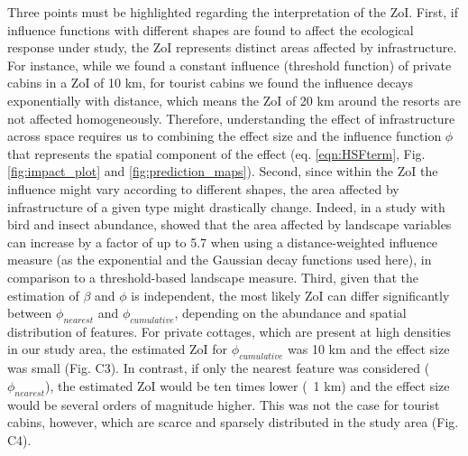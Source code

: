 \documentclass[titlepage]{article}
\begin{document}
Three points must be highlighted regarding the interpretation of the ZoI.
First, if influence functions with different shapes are found to affect the ecological response under study, the ZoI represents distinct areas affected by infrastructure. For instance, while we found a constant influence (threshold function) of private cabins in a ZoI of 10 km, for tourist cabins we found the influence  decays exponentially with distance, which means the ZoI of 20 km around the resorts are not affected homogeneously. Therefore, understanding the effect of infrastructure across space requires us to combining the effect size and the influence function $\phi$ that represents the spatial component of the effect (eq. \ref{eqn:HSFterm}, Fig. \ref{fig:impact_plot} and \ref{fig:prediction_maps}). Second, since within the ZoI the influence might vary according to different shapes, the area affected by infrastructure of a given type might drastically change. Indeed, in a study with bird and insect abundance, \citet{miguet_how_2017} showed that the area affected by landscape variables can increase by a factor of up to 5.7 when using a distance-weighted influence measure (as the exponential and the Gaussian decay functions used here), in comparison to a threshold-based landscape measure. Third, given that the estimation of $\beta$ and $\phi$ is independent, the most likely ZoI can differ significantly between $\phi_{nearest}$ and $\phi_{cumulative}$, depending on the abundance and spatial distribution of features. For private cottages, which are present at high densities in our study area, the estimated ZoI for $\phi_{cumulative}$ was 10 km and the effect size was small (Fig. C3). In contrast, if only the nearest feature was considered ($\phi_{nearest}$), the estimated ZoI would be ten times lower (~1 km) and the effect size would be several orders of magnitude higher. This was not the case for tourist cabins, however, which are scarce and sparsely distributed in the study area (Fig. C4).

\end{document}
